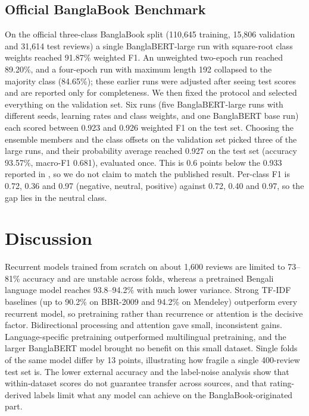 \documentclass[journal]{IEEEtran}
\begin{document}
\subsection{Official BanglaBook Benchmark}
On the official three-class BanglaBook split (110{,}645 training, 15{,}806 validation and 31{,}614 test reviews) a single BanglaBERT-large run with square-root class weights reached 91.87\% weighted F1. An unweighted two-epoch run reached 89.20\%, and a four-epoch run with maximum length 192 collapsed to the majority class (84.65\%); these earlier runs were adjusted after seeing test scores and are reported only for completeness. We then fixed the protocol and selected everything on the validation set. Six runs (five BanglaBERT-large runs with different seeds, learning rates and class weights, and one BanglaBERT base run) each scored between 0.923 and 0.926 weighted F1 on the test set. Choosing the ensemble members and the class offsets on the validation set picked three of the large runs, and their probability average reached 0.927 on the test set (accuracy 93.57\%, macro-F1 0.681), evaluated once. This is 0.6 points below the 0.933 reported in \cite{kabir2023}, so we do not claim to match the published result. Per-class F1 is 0.72, 0.36 and 0.97 (negative, neutral, positive) against 0.72, 0.40 and 0.97, so the gap lies in the neutral class.

\section{Discussion}
Recurrent models trained from scratch on about 1{,}600 reviews are limited to 73--81\% accuracy and are unstable across folds, whereas a pretrained Bengali language model reaches 93.8--94.2\% with much lower variance. Strong TF-IDF baselines (up to 90.2\% on BBR-2009 and 94.2\% on Mendeley) outperform every recurrent model, so pretraining rather than recurrence or attention is the decisive factor. Bidirectional processing and attention gave small, inconsistent gains. Language-specific pretraining outperformed multilingual pretraining, and the larger BanglaBERT model brought no benefit on this small dataset. Single folds of the same model differ by 13 points, illustrating how fragile a single 400-review test set is. The lower external accuracy and the label-noise analysis show that within-dataset scores do not guarantee transfer across sources, and that rating-derived labels limit what any model can achieve on the BanglaBook-originated part.
\end{document}
